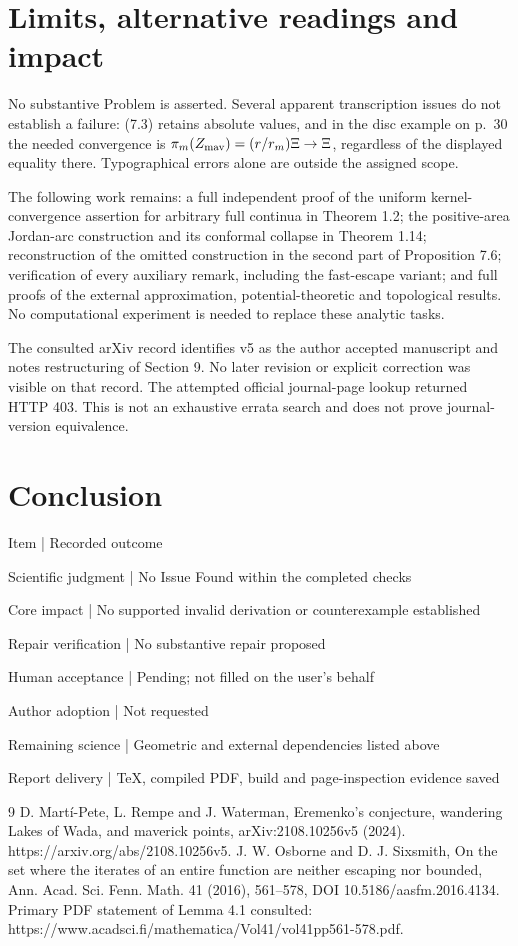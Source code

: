 \documentclass[10pt]{article}
\begin{document}
\section*{Limits, alternative readings and impact}
No substantive Problem is asserted. Several apparent transcription issues do not establish a failure: (7.3) retains absolute values, and in the disc example on p. 30 the needed convergence is \(\pi_m(Z_{\rm mav})=(r/r_m)\Xi\to\Xi\), regardless of the displayed equality there. Typographical errors alone are outside the assigned scope.\par
The following work remains: a full independent proof of the uniform kernel-convergence assertion for arbitrary full continua in Theorem 1.2; the positive-area Jordan-arc construction and its conformal collapse in Theorem 1.14; reconstruction of the omitted construction in the second part of Proposition 7.6; verification of every auxiliary remark, including the fast-escape variant; and full proofs of the external approximation, potential-theoretic and topological results. No computational experiment is needed to replace these analytic tasks.\par
The consulted arXiv record identifies v5 as the author accepted manuscript and notes restructuring of Section 9. No later revision or explicit correction was visible on that record. The attempted official journal-page lookup returned HTTP 403. This is not an exhaustive errata search and does not prove journal-version equivalence.\par
\section*{Conclusion}
Item | Recorded outcome\par
Scientific judgment | No Issue Found within the completed checks\par
Core impact | No supported invalid derivation or counterexample established\par
Repair verification | No substantive repair proposed\par
Human acceptance | Pending; not filled on the user’s behalf\par
Author adoption | Not requested\par
Remaining science | Geometric and external dependencies listed above\par
Report delivery | TeX, compiled PDF, build and page-inspection evidence saved\par
9 D. Martí-Pete, L. Rempe and J. Waterman, Eremenko’s conjecture, wandering Lakes of Wada, and maverick points, arXiv:2108.10256v5 (2024). https://arxiv.org/abs/2108.10256v5. J. W. Osborne and D. J. Sixsmith, On the set where the iterates of an entire function are neither escaping nor bounded, Ann. Acad. Sci. Fenn. Math. 41 (2016), 561–578, DOI 10.5186/aasfm.2016.4134. Primary PDF statement of Lemma 4.1 consulted: https://www.acadsci.fi/mathematica/Vol41/vol41pp561-578.pdf.\par
\end{document}
